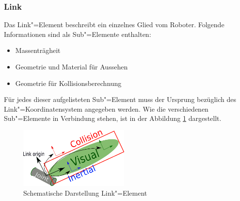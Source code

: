 

\subsubsection*{Link}
Das Link"=Element beschreibt ein einzelnes Glied vom Roboter.
Folgende Informationen sind als Sub"=Elemente enthalten: 
\begin{itemize}
\item Massenträgheit
\item Geometrie und Material für Aussehen
\item Geometrie für Kollisionsberechnung
\end{itemize}
Für jedes dieser aufgelisteten Sub"=Element muss der Ursprung bezüglich des Link"=Koordinatensystem angegeben werden.
Wie die verschiedenen Sub"=Elemente in Verbindung stehen, ist in der Abbildung \ref{Ab:aufbaut-link} dargestellt.
\begin{figure}[ht!]
	\centering
	\includegraphics[width=5.5cm]{images/urdf_link.png}
	\caption{Schematische Darstellung Link"=Element \cite{ros}}
	\label{Ab:aufbaut-link}
\end{figure}

